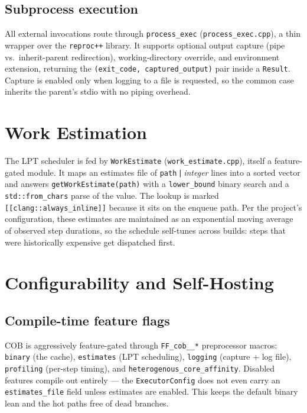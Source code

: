 \documentclass[11pt]{article}
\begin{document}
\subsection{Subprocess execution}

All external invocations route through \lstinline|process_exec|
(\texttt{process\_exec.cpp}), a thin wrapper over the \texttt{reproc++} library.
It supports optional output capture (pipe vs.\ inherit-parent redirection),
working-directory override, and environment extension, returning the
\lstinline|(exit_code, captured_output)| pair inside a \lstinline|Result|.
Capture is enabled only when logging to a file is requested, so the common case
inherits the parent's stdio with no piping overhead.

\section{Work Estimation}\label{sec:estimate}

The LPT scheduler is fed by \lstinline|WorkEstimate|
(\texttt{work\_estimate.cpp}), itself a feature-gated module. It maps an
estimates file of \lstinline|path|\,\lstinline=|=\,\textit{integer} lines into a
sorted vector and answers \lstinline|getWorkEstimate(path)| with a
\lstinline|lower_bound| binary search and a \lstinline|std::from_chars| parse of
the value. The lookup is marked \lstinline|[[clang::always_inline]]| because it
sits on the enqueue path. Per the project's configuration, these estimates are
maintained as an exponential moving average of observed step durations, so the
schedule self-tunes across builds: steps that were historically expensive get
dispatched first.

\section{Configurability and Self-Hosting}

\subsection{Compile-time feature flags}

COB is aggressively feature-gated through \lstinline|FF_cob__*| preprocessor
macros: \lstinline|binary| (the cache), \lstinline|estimates| (LPT scheduling),
\lstinline|logging| (capture + log file), \lstinline|profiling| (per-step
timing), and \lstinline|heterogenous_core_affinity|. Disabled features compile
out entirely --- the \lstinline|ExecutorConfig| does not even carry an
\lstinline|estimates_file| field unless estimates are enabled. This keeps the
default binary lean and the hot paths free of dead branches.
\end{document}
